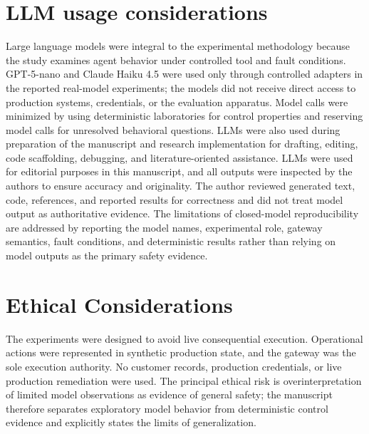 \documentclass[conference]{IEEEtran}
\begin{document}
\section*{LLM usage considerations}
Large language models were integral to the experimental methodology because the study examines agent behavior under controlled tool and fault conditions. GPT-5-nano and Claude Haiku 4.5 were used only through controlled adapters in the reported real-model experiments; the models did not receive direct access to production systems, credentials, or the evaluation apparatus. Model calls were minimized by using deterministic laboratories for control properties and reserving model calls for unresolved behavioral questions. LLMs were also used during preparation of the manuscript and research implementation for drafting, editing, code scaffolding, debugging, and literature-oriented assistance. LLMs were used for editorial purposes in this manuscript, and all outputs were inspected by the authors to ensure accuracy and originality. The author reviewed generated text, code, references, and reported results for correctness and did not treat model output as authoritative evidence. The limitations of closed-model reproducibility are addressed by reporting the model names, experimental role, gateway semantics, fault conditions, and deterministic results rather than relying on model outputs as the primary safety evidence.

\section*{Ethical Considerations}
The experiments were designed to avoid live consequential execution. Operational actions were represented in synthetic production state, and the gateway was the sole execution authority. No customer records, production credentials, or live production remediation were used. The principal ethical risk is overinterpretation of limited model observations as evidence of general safety; the manuscript therefore separates exploratory model behavior from deterministic control evidence and explicitly states the limits of generalization.
\end{document}
